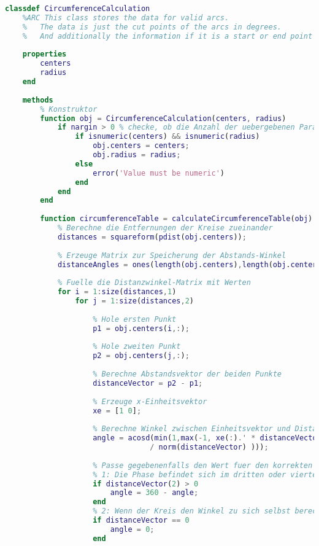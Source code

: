 \begin{lstlisting}[language=MATLAB, caption=Verfeinerung der lokalen Minima, label=lst:CircumferenceCalculation]
classdef CircumferenceCalculation
    %ARC This class stores the data for valid arcs.
    %   The data is just the cut points of the arcs in degrees.
    %   And additionally the information if it is a start or end point
    
    properties
        centers
        radius
    end
    
    methods
        % Konstruktor
        function obj = CircumferenceCalculation(centers, radius)
            if nargin > 0 % checke, ob die Anzahl der uebergebenen Parameter groesser 0 ist
                if isnumeric(centers) && isnumeric(radius)
                    obj.centers = centers;
                    obj.radius = radius;
                else
                    error('Value must be numeric')
                end
            end
        end
        
        function circumferenceTable = calculateCircumferenceTable(obj)
            % Berechne die Entfernungen der Kreise zueinander
            distances = squareform(pdist(obj.centers));
            
            % Erzeuge Matrix zur Speicherung der Abstands-Winkel
            distanceAngles = ones(length(obj.centers),length(obj.centers));
            
            % Fuelle die Distanzwinkel-Matrix mit Werten
            for i = 1:size(distances,1)
                for j = 1:size(distances,2)
                    
                    % Hole ersten Punkt
                    p1 = obj.centers(i,:);
                    
                    % Hole zweiten Punkt
                    p2 = obj.centers(j,:);
                    
                    % Berechne Abstandsvektor der beiden Punkte
                    distanceVector = p2 - p1;
                    
                    % Erzeuge x-Einheitsvektor
                    xe = [1 0];
                    
                    % Berechne Winkel zwischen Einheitsvektor und Distanzvektor
                    angle = acosd(min(1,max(-1, xe(:).' * distanceVector(:) / norm(xe) ...
                    			 / norm(distanceVector) )));
                    
                    % Passe gegebenenfalls den Wert fuer den korrekten Quadranten an
                    % 1: Die Phase befindet sich im dritten oder vierten Quadranten
                    if distanceVector(2) > 0
                        angle = 360 - angle;
                    end
                    % 2: Wenn der Kreis den Winkel zu sich selbst berechnet
                    if distanceVector == 0
                        angle = 0;
                    end
                    

\end{lstlisting}
